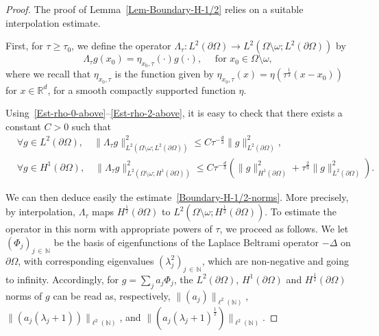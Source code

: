 \documentclass[AHL,Unicode,longabstracts]{cedram}
\newcommand*\R{\mathbb{R}}
\newcommand*\N{\mathbb{N}}
\renewcommand{\leq}{\leqslant}
\renewcommand{\geq}{\geqslant}
\let\oldforall\forall
\renewcommand*{\forall}{\mathrel{\oldforall}}
\begin{document}
\begin{proof}
The proof of Lemma~\ref{Lem-Boundary-H-1/2} relies on a suitable interpolation estimate.

First, for $\tau \geq \tau_0$, we define the operator $ \Lambda_{\tau}: L^2(\partial \Omega) \to L^2(\Omega\setminus\omega; L^2(\partial\Omega)) $ by
\begin{equation*}
\Lambda_{\tau} g(x_0) = \eta_{x_0, \tau}(\cdot) g (\cdot), \quad \text{ for } x_0 \in \Omega \setminus \omega,
\end{equation*}
where we recall that $\eta_{x_0, \tau}$ is the function given by $\eta_{x_0, \tau} (x) = \eta (\tau^{\frac{1}{3}} (x-x_0))$ for $x \in \R^d$, for a smooth compactly supported function $\eta$.

Using~\eqref{Est-rho-0-above}--\eqref{Est-rho-2-above}, it is easy to check that there exists a constant $C>0$ such that
\begin{align*}
&\forall g \in L^2(\partial \Omega),
\quad
\| \Lambda_\tau g \|_{L^2\left(\Omega\setminus\omega; L^2(\partial\Omega)\right)}^2
\leq C \tau^{-\frac{d}{3}} \|g \|_{L^2(\partial \Omega)}^2,
\\
&\forall g \in H^1(\partial \Omega),
\quad
\| \Lambda_\tau g \|_{L^2\left(\Omega\setminus\omega; H^1(\partial\Omega)\right)}^2
\leq C \tau^{-\frac{d}{3}} \left(\|g \|_{H^1(\partial \Omega)}^2 + \tau^{\frac{2}{3}} \| g \|_{L^2(\partial \Omega)}^2\right).
\end{align*}

We can then deduce easily the estimate~\eqref{Boundary-H-1/2-norms}. More precisely, by interpolation, $\Lambda_\tau$ maps $H^{\frac{1}{2}}(\partial \Omega)$ to $ L^2(\Omega\setminus\omega; H^{\frac{1}{2}}(\partial\Omega))$. To estimate the operator in this norm with appropriate powers of $\tau$, we proceed as follows. We let $(\Phi_j)_{j\, \in\,\N} $ be the basis of eigenfunctions of the Laplace Beltrami operator $-\Delta$ on $\partial \Omega$, with corresponding eigenvalues $(\lambda_j^2)_{j\,\in\,\N}$, which are non-negative and going to infinity. Accordingly, for $g = \sum_j a_j \Phi_j$, the $L^2(\partial \Omega)$, $H^1(\partial \Omega)$ and $H^{\frac{1}{2}}(\partial \Omega)$ norms of $g$ can be read as, respectively, $\| (a_j)\|_{\ell^2(\N)}$, $\|(a_j (\lambda_j +1)) \|_{\ell^2(\N)}$, and $\|(a_j (\lambda_j +1)^{\frac{1}{2}})\|_{\ell^2(\N)}$.


\end{proof}
\end{document}
